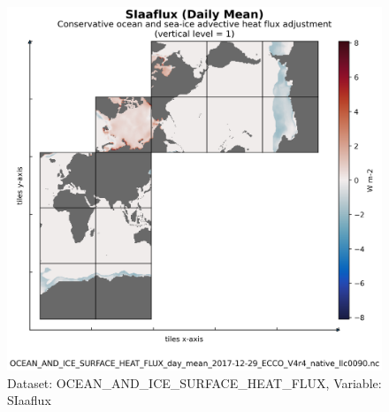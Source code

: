 \begin{figure}[H]
\centering
\includegraphics[scale=0.55]{../images/plots/native_plots/Ocean_and_Sea-Ice_Surface_Heat_Fluxes/SIaaflux.png}
\caption{Dataset: OCEAN\_AND\_ICE\_SURFACE\_HEAT\_FLUX, Variable: SIaaflux}
\label{tab:table-OCEAN_AND_ICE_SURFACE_HEAT_FLUX_SIaaflux-Plot}
\end{figure}
\newpage
\pagebreak
